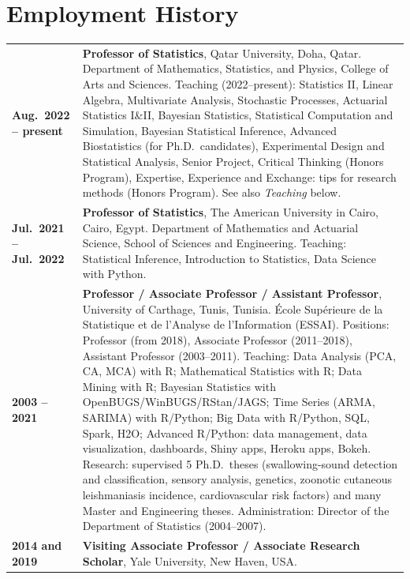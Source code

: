 \documentclass[10pt,a4paper]{article}
\makeatletter
\newenvironment{cvdated}{%
  \begin{longtable}{@{}>{\raggedleft\arraybackslash\bfseries}p{3.35cm}@{\hspace{0.35cm}}p{\dimexpr\textwidth-3.7cm\relax}@{}}}%
  {\end{longtable}\vspace{-10pt}}
\newcommand{\cvrow}[2]{#1 & #2 \\[3pt]}
\makeatother
\begin{document}
\section{Employment History}
\begin{cvdated}
\cvrow{Aug.\ 2022 -- present}{\textbf{Professor of Statistics}, Qatar University, Doha, Qatar.\newline
Department of Mathematics, Statistics, and Physics, College of Arts and Sciences.\newline
Teaching (2022--present): Statistics II, Linear Algebra, Multivariate Analysis, Stochastic Processes, Actuarial
Statistics I\&II, Bayesian Statistics, Statistical Computation and Simulation, Bayesian Statistical Inference,
Advanced Biostatistics (for Ph.D.\ candidates), Experimental Design and Statistical Analysis, Senior Project,
Critical Thinking (Honors Program), Expertise, Experience and Exchange: tips for research methods (Honors Program).
See also \emph{Teaching} below.}
\cvrow{Jul.\ 2021 -- Jul.\ 2022}{\textbf{Professor of Statistics}, The American University in Cairo, Cairo, Egypt.\newline
Department of Mathematics and Actuarial Science, School of Sciences and Engineering.\newline
Teaching: Statistical Inference, Introduction to Statistics, Data Science with Python.}
\cvrow{2003 -- 2021}{\textbf{Professor / Associate Professor / Assistant Professor}, University of Carthage, Tunis, Tunisia.\newline
\'Ecole Sup\'erieure de la Statistique et de l'Analyse de l'Information (ESSAI).\newline
Positions: Professor (from 2018), Associate Professor (2011--2018), Assistant Professor (2003--2011).\newline
Teaching: Data Analysis (PCA, CA, MCA) with R; Mathematical Statistics with R; Data Mining with R; Bayesian
Statistics with OpenBUGS/WinBUGS/RStan/JAGS; Time Series (ARMA, SARIMA) with R/Python; Big Data with R/Python,
SQL, Spark, H2O; Advanced R/Python: data management, data visualization, dashboards, Shiny apps, Heroku apps, Bokeh.\newline
Research: supervised 5 Ph.D.\ theses (swallowing-sound detection and classification, sensory analysis, genetics,
zoonotic cutaneous leishmaniasis incidence, cardiovascular risk factors) and many Master and Engineering theses.\newline
Administration: Director of the Department of Statistics (2004--2007).}
\cvrow{2014 and 2019}{\textbf{Visiting Associate Professor / Associate Research Scholar}, Yale University, New Haven, USA.\newline
}
\end{cvdated}
\end{document}
